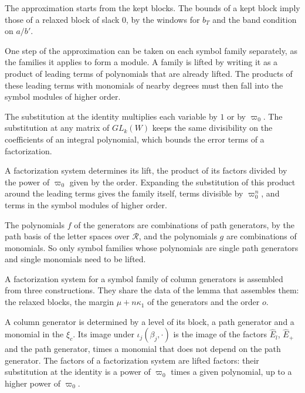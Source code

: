 The approximation starts from the kept blocks. The bounds of a kept block imply those of a relaxed block of slack $0$,
by the windows for $b_T$ and the band condition on $a/b'$.

One step of the approximation can be taken on each symbol family separately, as the families it applies to form a module.
A family is lifted by writing it as a product of leading terms of polynomials that are already lifted. The products of
these leading terms with monomials of nearby degrees must then fall into the symbol modules of higher order.

The substitution at the identity multiplies each variable by $1$ or by $\varpi_0$. The substitution at any matrix of
$GL_k(W)$ keeps the same divisibility on the coefficients of an integral polynomial, which bounds the error terms of a
factorization.

A factorization system determines its lift, the product of its factors divided by the power of $\varpi_0$ given by the
order. Expanding the substitution of this product around the leading terms gives the family itself, terms divisible by
$\varpi_0^n$, and terms in the symbol modules of higher order.

The polynomials $f$ of the generators are combinations of path generators, by the path basis of the letter spaces over
$\mathcal R$, and the polynomials $g$ are combinations of monomials. So only symbol families whose polynomials are single
path generators and single monomials need to be lifted.

A factorization system for a symbol family of column generators is assembled from three constructions. They share the data
of the lemma that assembles them: the relaxed blocks, the margin $\mu+n\kappa_1$ of the generators and the order $o$.

A column generator is determined by a level of its block, a path generator and a monomial in the $\xi_c$. Its image under
$\iota_j(\beta_j,\cdot)$ is the image of the factors $\hat E_l$, $\hat E_+$ and the path generator, times a monomial that does not
depend on the path generator. The factors of a factorization system are lifted factors: their substitution at the identity is a
power of $\varpi_0$ times a given polynomial, up to a higher power of $\varpi_0$.

